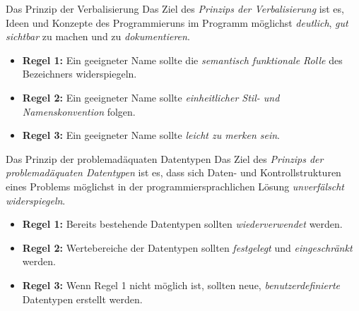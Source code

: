 \begin{defi}{Das Prinzip der Verbalisierung}
    Das Ziel des \emph{Prinzips der Verbalisierung} ist es, Ideen und Konzepte des Programmieruns im Programm möglichst \emph{deutlich}, \emph{gut sichtbar} zu machen und zu \emph{dokumentieren}.

    \begin{itemize}
        \item \textbf{Regel 1:} Ein geeigneter Name sollte die \emph{semantisch funktionale Rolle} des Bezeichners widerspiegeln.
        \item \textbf{Regel 2:} Ein geeigneter Name sollte \emph{einheitlicher Stil- und Namenskonvention} folgen.
        \item \textbf{Regel 3:} Ein geeigneter Name sollte \emph{leicht zu merken sein}.
    \end{itemize}
\end{defi}

\begin{defi}{Das Prinzip der problemadäquaten Datentypen}
    Das Ziel des \emph{Prinzips der problemadäquaten Datentypen} ist es, dass sich Daten- und Kontrollstrukturen eines Problems möglichst in der programmiersprachlichen Lösung \emph{unverfälscht widerspiegeln}.

    \begin{itemize}
        \item \textbf{Regel 1:} Bereits bestehende Datentypen sollten \emph{wiederverwendet} werden.
        \item \textbf{Regel 2:} Wertebereiche der Datentypen sollten \emph{festgelegt} und \emph{eingeschränkt} werden.
        \item \textbf{Regel 3:} Wenn Regel 1 nicht möglich ist, sollten neue, \emph{benutzerdefinierte} Datentypen erstellt werden.
    \end{itemize}
\end{defi}
